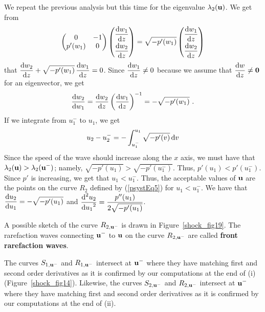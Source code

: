 \begin{egg}
We repeat the previous analysis but this time for the eigenvalue
$\lambda_2(\mathbf{u})$.  We get from
\[
\begin{pmatrix} 0 & -1 \\ p'(w_1) & 0 \end{pmatrix}
\begin{pmatrix} \displaystyle \frac{\mathrm{d}w_1}{\mathrm{d}{z}} \\[0.6em]
\displaystyle \frac{\mathrm{d}w_2}{\mathrm{d}{z}} \end{pmatrix}
= \sqrt{-p'(w_1)} \begin{pmatrix} \displaystyle \frac{\mathrm{d}w_1}{\mathrm{d}{z}} \\[0.6em]
\displaystyle \frac{\mathrm{d}w_2}{\mathrm{d}{z}} \end{pmatrix}
\]
that
$\displaystyle \frac{\mathrm{d}w_2}{\mathrm{d}{z}} + \sqrt{-p'(w_1)} \, \frac{\mathrm{d}w_1}{\mathrm{d}{z}} = 0$.
Since $\displaystyle \frac{\mathrm{d}w_1}{\mathrm{d}{z}} \neq 0$ because we assume that
$\displaystyle \frac{\mathrm{d}w}{\mathrm{d}{z}} \neq \mathbf{0}$ for an eigenvector, we get
\[
\frac{\mathrm{d}w_2}{\mathrm{d}{w_1}} = \frac{\mathrm{d}w_2}{\mathrm{d}{z}} \left(  \frac{\mathrm{d}w_1}{\mathrm{d}{z}} \right)^{-1}
= -\sqrt{-p'(w_1)} \ .
\]
If we integrate from $\displaystyle u_1^-$ to $u_1$, we get
\begin{equation} \label{psystEq6}
u_2 - u_2^- = -\int_{u_1^-}^{u_1} \sqrt{-p'(v)} \,\mathrm{d}{v}
\end{equation}
Since the speed of the wave should increase along the $x$ axis, we
must have that
$\displaystyle \lambda_2(\mathbf{u}) > \lambda_2(\mathbf{u}^-)$; namely,
$\displaystyle \sqrt{-p'(u_1)} > \sqrt{-p'(u_1^-)}$.  Thus,
$\displaystyle p'(u_1) < p'(u_1^-)$.  Since $p'$ is increasing, we get that
$\displaystyle u_1 < u_1^-$.
Thus, the acceptable values of $\mathbf{u}$ are the points on the curve
$R_2$ defined by (\ref{psystEq5}) for $\displaystyle u_1 < u_1^-$.  We
have that $\displaystyle \frac{\mathrm{d}u_2}{\mathrm{d}{u_1}} = -\sqrt{-p'(u_1)}$ and
$\displaystyle \frac{\displaystyle \mathrm{d}^{2}{u_2}} {\displaystyle \mathrm{d}{u_1}^{2}} = \frac{p''(u_1)}{2\sqrt{-p'(u_1)}}$.

A possible sketch of the curve $R_{2,\mathbf{u}^-}$ is drawn in
Figure~\ref{shock_fig19}.
The rarefaction waves connecting $\displaystyle \mathbf{u}^-$
to $\mathbf{u}$ on the curve $R_{2,\mathbf{u}^-}$ are called {\bfseries
front rarefaction waves}.

The curves $S_{1,\mathbf{u}^-}$ and
$R_{1,\mathbf{u}^-}$ intersect at $\displaystyle \mathbf{u}^-$ where they have matching
first and second order derivatives as it is confirmed by our
computations at the end of (i) (Figure~\ref{shock_fig14}).
Likewise, the curves $S_{2,\mathbf{u}^-}$ and
$R_{2,\mathbf{u}^-}$ intersect at $\displaystyle \mathbf{u}^-$ where they
have matching first and second order derivatives as it is confirmed by our
computations at the end of (ii).


\end{egg}
